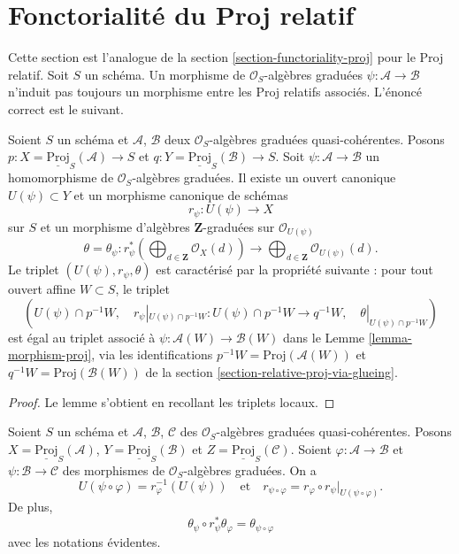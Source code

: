 \section{Fonctorialité du Proj relatif}
\label{section-functoriality-relative-proj}

\noindent
Cette section est l'analogue de la section \ref{section-functoriality-proj}
pour le Proj relatif. Soit $S$ un schéma. Un morphisme de
$\mathcal{O}_S$-algèbres graduées $\psi : \mathcal{A} \to \mathcal{B}$
n'induit pas toujours un morphisme entre les Proj relatifs associés. L'énoncé correct est le suivant.

\begin{lemma}
\label{lemma-morphism-relative-proj}
Soient $S$ un schéma et $\mathcal{A}$, $\mathcal{B}$ deux
$\mathcal{O}_S$-algèbres graduées quasi-cohérentes. Posons
$p : X = \underline{\text{Proj}}_S(\mathcal{A}) \to S$ et
$q : Y = \underline{\text{Proj}}_S(\mathcal{B}) \to S$.
Soit $\psi : \mathcal{A} \to \mathcal{B}$ un homomorphisme de
$\mathcal{O}_S$-algèbres graduées. Il existe un ouvert canonique
$U(\psi) \subset Y$ et un morphisme canonique de schémas
$$
r_\psi :
U(\psi)
\longrightarrow
X
$$ sur $S$
et un morphisme d'algèbres $\mathbf{Z}$-graduées sur
$\mathcal{O}_{U(\psi)}$
$$
\theta = \theta_\psi :
r_\psi^*\left(
\bigoplus\nolimits_{d \in \mathbf{Z}} \mathcal{O}_X(d)
\right)
\longrightarrow
\bigoplus\nolimits_{d \in \mathbf{Z}} \mathcal{O}_{U(\psi)}(d).
$$
Le triplet $(U(\psi), r_\psi, \theta)$ est caractérisé par la propriété
suivante : pour tout ouvert affine $W \subset S$, le triplet
$$
(U(\psi) \cap p^{-1}W,\quad
r_\psi|_{U(\psi) \cap p^{-1}W} : U(\psi) \cap p^{-1}W \to q^{-1}W,\quad
\theta|_{U(\psi) \cap p^{-1}W})
$$ est égal au triplet associé à
$\psi : \mathcal{A}(W) \to \mathcal{B}(W)$ dans le
Lemme \ref{lemma-morphism-proj}, via les identifications
$p^{-1}W = \text{Proj}(\mathcal{A}(W))$ et
$q^{-1}W = \text{Proj}(\mathcal{B}(W))$ de la
section \ref{section-relative-proj-via-glueing}.
\end{lemma}

\begin{proof}
Le lemme s'obtient en recollant les triplets locaux.
\end{proof}

\begin{lemma}
\label{lemma-morphism-relative-proj-transitive}
Soient $S$ un schéma et $\mathcal{A}$, $\mathcal{B}$, $\mathcal{C}$ des
$\mathcal{O}_S$-algèbres graduées quasi-cohérentes. Posons
$X = \underline{\text{Proj}}_S(\mathcal{A})$,
$Y = \underline{\text{Proj}}_S(\mathcal{B})$ et
$Z = \underline{\text{Proj}}_S(\mathcal{C})$.
Soient $\varphi : \mathcal{A} \to \mathcal{B}$ et
$\psi : \mathcal{B} \to \mathcal{C}$ des morphismes de
$\mathcal{O}_S$-algèbres graduées. On a
$$
U(\psi \circ \varphi) = r_\varphi^{-1}(U(\psi))
\quad
\text{et}
\quad
r_{\psi \circ \varphi}
=
r_\varphi \circ r_\psi|_{U(\psi \circ \varphi)}.
$$
De plus,
$$
\theta_\psi \circ r_\psi^*\theta_\varphi
=
\theta_{\psi \circ \varphi}
$$
avec les notations évidentes.
\end{lemma}

